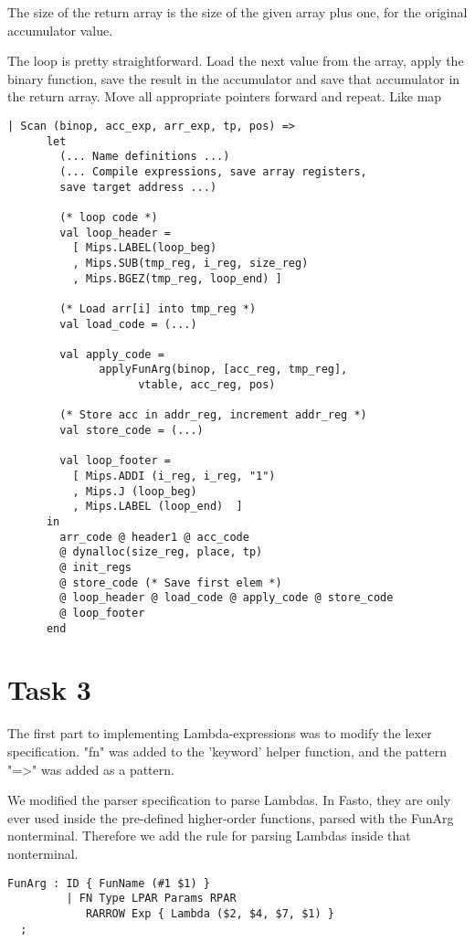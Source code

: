 \documentclass[10pt]{article}
\begin{document}
The size of the return array is the size of the given array plus one, for the original accumulator value.

The loop is pretty straightforward. Load the next value from the array, apply the binary function, save the result in the accumulator and save that accumulator in the return array. Move all appropriate pointers forward and repeat. Like map

\begin{Verbatim}[frame=single]
  | Scan (binop, acc_exp, arr_exp, tp, pos) =>
      let
        (... Name definitions ...)
        (... Compile expressions, save array registers, 
        save target address ...)

        (* loop code *)
        val loop_header =
          [ Mips.LABEL(loop_beg)
          , Mips.SUB(tmp_reg, i_reg, size_reg)
          , Mips.BGEZ(tmp_reg, loop_end) ]
  
        (* Load arr[i] into tmp_reg *)
        val load_code = (...)
  
        val apply_code =
              applyFunArg(binop, [acc_reg, tmp_reg], 
              		vtable, acc_reg, pos)
  
        (* Store acc in addr_reg, increment addr_reg *)
        val store_code = (...)
              
        val loop_footer =
          [ Mips.ADDI (i_reg, i_reg, "1")
          , Mips.J (loop_beg)
          , Mips.LABEL (loop_end)  ]
      in
        arr_code @ header1 @ acc_code
        @ dynalloc(size_reg, place, tp)
        @ init_regs
        @ store_code (* Save first elem *)
        @ loop_header @ load_code @ apply_code @ store_code 
        @ loop_footer
      end
\end{Verbatim}

\section{Task 3}
The first part to implementing Lambda-expressions was to modify the lexer specification. "fn" was added to the 'keyword' helper function, and the pattern "=>" was added as a pattern.

We modified the parser specification to parse Lambdas. In Fasto, they are only ever used inside the pre-defined higher-order functions, parsed with the FunArg nonterminal. Therefore we add the rule for parsing Lambdas inside that nonterminal.
\begin{Verbatim}[frame=single]
  FunArg : ID { FunName (#1 $1) }
         | FN Type LPAR Params RPAR
			RARROW Exp { Lambda ($2, $4, $7, $1) }
  ;
\end{Verbatim}
\end{document}
